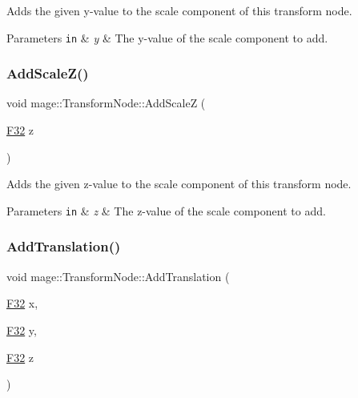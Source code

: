 Adds the given y-\/value to the scale component of this transform node.


\begin{DoxyParams}[1]{Parameters}
\mbox{\tt in}  & {\em y} & The y-\/value of the scale component to add. \\
\hline
\end{DoxyParams}
\hypertarget{structmage_1_1_transform_node_ae4550e69f9197e400ec21a3665cb5e34}{}\label{structmage_1_1_transform_node_ae4550e69f9197e400ec21a3665cb5e34} 
\subsubsection{\texorpdfstring{Add\+Scale\+Z()}{AddScaleZ()}}
{\footnotesize\ttfamily void mage\+::\+Transform\+Node\+::\+Add\+ScaleZ (\begin{DoxyParamCaption}\item[{\hyperlink{namespacemage_aa97e833b45f06d60a0a9c4fc22ae02c0}{F32}}]{z }\end{DoxyParamCaption})\hspace{0.3cm}{\ttfamily [noexcept]}}

Adds the given z-\/value to the scale component of this transform node.


\begin{DoxyParams}[1]{Parameters}
\mbox{\tt in}  & {\em z} & The z-\/value of the scale component to add. \\
\hline
\end{DoxyParams}
\hypertarget{structmage_1_1_transform_node_a14c69b375da244d14e0f253ff217785d}{}\label{structmage_1_1_transform_node_a14c69b375da244d14e0f253ff217785d} 
\subsubsection{\texorpdfstring{Add\+Translation()}{AddTranslation()}\hspace{0.1cm}{\footnotesize\ttfamily [1/3]}}
{\footnotesize\ttfamily void mage\+::\+Transform\+Node\+::\+Add\+Translation (\begin{DoxyParamCaption}\item[{\hyperlink{namespacemage_aa97e833b45f06d60a0a9c4fc22ae02c0}{F32}}]{x,  }\item[{\hyperlink{namespacemage_aa97e833b45f06d60a0a9c4fc22ae02c0}{F32}}]{y,  }\item[{\hyperlink{namespacemage_aa97e833b45f06d60a0a9c4fc22ae02c0}{F32}}]{z }\end{DoxyParamCaption})\hspace{0.3cm}{\ttfamily [noexcept]}}

